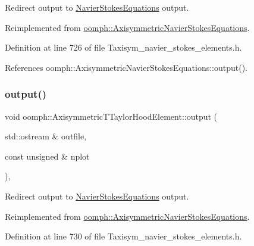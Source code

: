 Redirect output to \hyperlink{classoomph_1_1NavierStokesEquations}{Navier\+Stokes\+Equations} output. 



Reimplemented from \hyperlink{classoomph_1_1AxisymmetricNavierStokesEquations_afe0c7b607ec3fd03a73b7db4f1fe6252}{oomph\+::\+Axisymmetric\+Navier\+Stokes\+Equations}.



Definition at line 726 of file Taxisym\+\_\+navier\+\_\+stokes\+\_\+elements.\+h.



References oomph\+::\+Axisymmetric\+Navier\+Stokes\+Equations\+::output().

\mbox{\label{classoomph_1_1AxisymmetricTTaylorHoodElement_a10ec676703edbf68120256082aa8c290}} 
\subsubsection{\texorpdfstring{output()}{output()}\hspace{0.1cm}{\footnotesize\ttfamily [2/4]}}
{\footnotesize\ttfamily void oomph\+::\+Axisymmetric\+T\+Taylor\+Hood\+Element\+::output (\begin{DoxyParamCaption}\item[{std\+::ostream \&}]{outfile,  }\item[{const unsigned \&}]{nplot }\end{DoxyParamCaption})\hspace{0.3cm}{\ttfamily [inline]}, {\ttfamily [virtual]}}



Redirect output to \hyperlink{classoomph_1_1NavierStokesEquations}{Navier\+Stokes\+Equations} output. 



Reimplemented from \hyperlink{classoomph_1_1AxisymmetricNavierStokesEquations_a94a243ca05ba3b995e366564e6cf7695}{oomph\+::\+Axisymmetric\+Navier\+Stokes\+Equations}.



Definition at line 730 of file Taxisym\+\_\+navier\+\_\+stokes\+\_\+elements.\+h.




